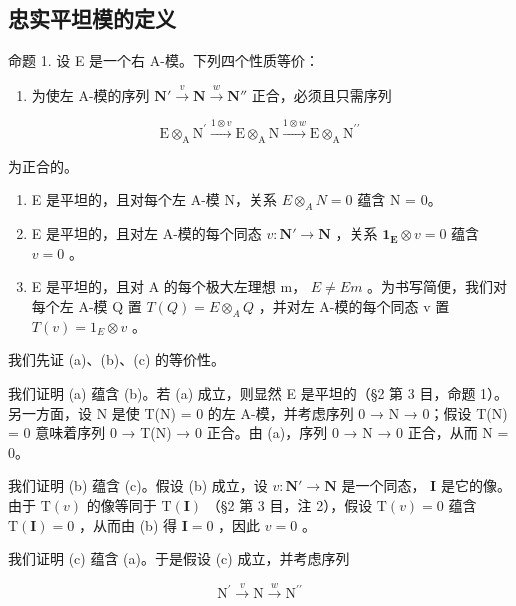 \subsection{忠实平坦模的定义}

命题 1. 设 E 是一个右 A-模。下列四个性质等价：

\begin{enumerate}
\def\labelenumi{(\alph{enumi})}
\tightlist
\item
  为使左 A-模的序列 \(\mathbf{N}' \xrightarrow{v} \mathbf{N} \xrightarrow{w} \mathbf{N}''\) 正合，必须且只需序列
\end{enumerate}

\[
\mathrm{E} \otimes_ {\mathrm{A}} \mathrm{N} ^ {\prime} \xrightarrow {1 \otimes v} \mathrm{E} \otimes_ {\mathrm{A}} \mathrm{N} \xrightarrow {1 \otimes w} \mathrm{E} \otimes_ {\mathrm{A}} \mathrm{N} ^ {\prime \prime}
\]

为正合的。

\begin{enumerate}
\def\labelenumi{(\alph{enumi})}
\setcounter{enumi}{1}
\item
  E 是平坦的，且对每个左 A-模 N，关系 \(E \otimes_{A} N = 0\) 蕴含 N = 0。
\item
  E 是平坦的，且对左 A-模的每个同态 \(v: \mathbf{N}' \to \mathbf{N}\) ，关系 \(\mathbf{1}_{\mathbf{E}} \otimes v = 0\) 蕴含 \(v = 0\) 。
\item
  E 是平坦的，且对 A 的每个极大左理想 m， \(E \neq Em\) 。为书写简便，我们对每个左 A-模 Q 置 \(T(Q) = E \otimes_{A} Q\) ，并对左 A-模的每个同态 v 置 \(T(v) = 1_{E} \otimes v\) 。
\end{enumerate}

我们先证 (a)、(b)、(c) 的等价性。

我们证明 (a) 蕴含 (b)。若 (a) 成立，则显然 E 是平坦的（§2 第 3 目，命题 1）。另一方面，设 N 是使 T(N) = 0 的左 A-模，并考虑序列 0 → N → 0；假设 T(N) = 0 意味着序列 0 → T(N) → 0 正合。由 (a)，序列 0 → N → 0 正合，从而 N = 0。

我们证明 (b) 蕴含 (c)。假设 (b) 成立，设 \(v: \mathbf{N}' \to \mathbf{N}\) 是一个同态， \(\mathbf{I}\) 是它的像。由于 \(\mathrm{T}(v)\) 的像等同于 \(\mathrm{T}(\mathbf{I})\) （§2 第 3 目，注 2），假设 \(\mathrm{T}(v) = 0\) 蕴含 \(\mathrm{T}(\mathbf{I}) = 0\) ，从而由 (b) 得 \(\mathbf{I} = 0\) ，因此 \(v = 0\) 。

我们证明 (c) 蕴含 (a)。于是假设 (c) 成立，并考虑序列

\[
\mathrm{N} ^ {\prime} \xrightarrow {v} \mathrm{N} \xrightarrow {w} \mathrm{N} ^ {\prime \prime}\tag{1}
\]

